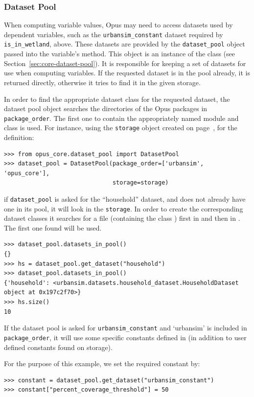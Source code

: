 \subsubsection{Dataset Pool}
%
When computing variable values, Opus may need to access datasets used by
dependent variables, such as the \verb|urbansim_constant| dataset required by
\verb|is_in_wetland|, above.  These datasets are provided by the
\verb|dataset_pool| object passed into the variable's  method.
This object is an instance of the  class (see Section~\ref{sec:core-dataset-pool}).  It is responsible
for keeping a set of datasets for use when computing
variables.  If the requested dataset is in the pool already, it is returned
directly, otherwise it tries to find it in the given storage.

In order to find the appropriate dataset class for the requested dataset, the dataset
pool object searches the  directories of the Opus packages in
\verb|package_order|.  The first one to contain the appropriately named module
and class is used.  For instance, using the \verb|storage| object created on page~\pageref{storagepage},
for the definition:
\begin{verbatim}
>>> from opus_core.dataset_pool import DatasetPool
>>> dataset_pool = DatasetPool(package_order=['urbansim', 'opus_core'],
                               storage=storage)
\end{verbatim}
if \verb|dataset_pool| is asked for the ``household'' dataset, and does not
already have one in its pool, it will look in the \verb|storage|. In order to
create the corresponding dataset classes
it searches for a file
 (containing the class ) first in  and then in
. The first one found will be used.
\begin{verbatim}
>>> dataset_pool.datasets_in_pool()
{}
>>> hs = dataset_pool.get_dataset("household")
>>> dataset_pool.datasets_in_pool()
{'household': <urbansim.datasets.household_dataset.HouseholdDataset object at 0x197c2f70>}
>>> hs.size()
10
\end{verbatim}
If the dataset pool is asked for \verb|urbansim_constant| and `urbansim' is included in \verb|package_order|,
it will use some  specific constants defined in  (in addition to
user defined constants found on storage).

For the purpose of this example, we set the required constant by:
\begin{verbatim}
>>> constant = dataset_pool.get_dataset("urbansim_constant")
>>> constant["percent_coverage_threshold"] = 50
\end{verbatim}

